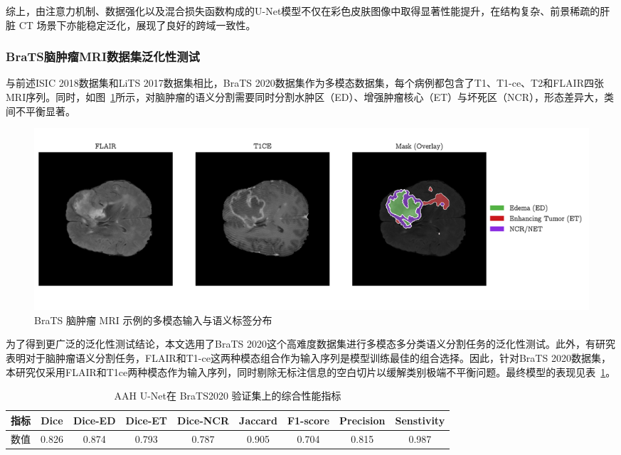 综上，由注意力机制、数据强化以及混合损失函数构成的U-Net模型不仅在彩色皮肤图像中取得显著性能提升，在结构复杂、前景稀疏的肝脏 CT 场景下亦能稳定泛化，展现了良好的跨域一致性。

\subsubsection{BraTS脑肿瘤MRI数据集泛化性测试}

与前述ISIC 2018数据集和LiTS 2017数据集相比，BraTS 2020数据集作为多模态数据集，每个病例都包含了T1、T1-ce、T2和FLAIR四张MRI序列。同时，如图~\ref{fig:final}所示，对脑肿瘤的语义分割需要同时分割水肿区（ED）、增强肿瘤核心（ET）与坏死区（NCR），形态差异大，类间不平衡显著。

\begin{figure}[!h]
    \centering
    \includegraphics[width=\textwidth]{fig/final_3view_with_right_legend.png}
    \caption{BraTS 脑肿瘤 MRI 示例的多模态输入与语义标签分布}
    \label{fig:final}
\end{figure}

为了得到更广泛的泛化性测试结论，本文选用了BraTS 2020这个高难度数据集进行多模态多分类语义分割任务的泛化性测试。此外，有研究表明对于脑肿瘤语义分割任务，FLAIR和T1-ce这两种模态组合作为输入序列是模型训练最佳的组合选择\cite{buchner2023}。因此，针对BraTS 2020数据集，本研究仅采用FLAIR和T1ce两种模态作为输入序列，同时剔除无标注信息的空白切片以缓解类别极端不平衡问题。最终模型的表现见表~\ref{tab:brain_final_metrics}。

\begin{table}[!h]
    \centering
    \caption{AAH U-Net在 BraTS2020 验证集上的综合性能指标}
    \label{tab:brain_final_metrics}
    \begin{tabular}{lcccccccc}
        \toprule
        指标 & Dice & Dice-ED & Dice-ET & Dice-NCR & Jaccard & F1-score & Precision & Senstivity\\
        \midrule
        数值 & 0.826 & 0.874 & 0.793 & 0.787 & 0.905 & 0.704 & 0.815 & 0.987 \\
        \bottomrule
    \end{tabular}
\end{table}

